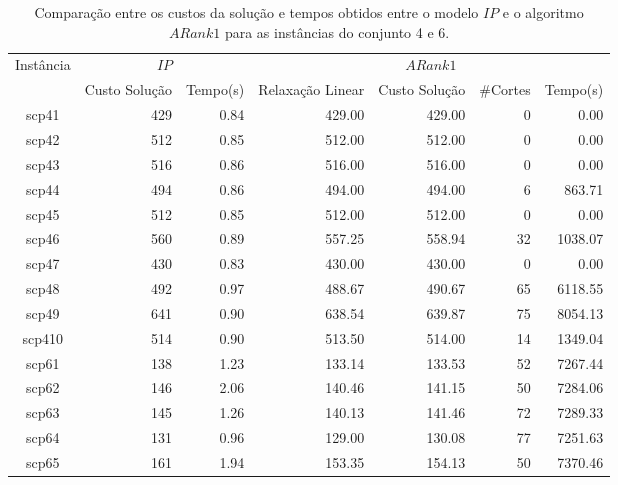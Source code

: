 \begin{table}[htbp]
\begin{center}
  \begin{tabular}{|c|r|r|r|r|r|r|}
    \hline
      Instância & \multicolumn{2}{|c|}{$IP$} & \multicolumn{4}{|c|}{$ARank1$}\\
                & Custo Solução    & Tempo(s)   & Relaxação Linear  & Custo Solução   & \#Cortes & Tempo(s)      \\ \hline
      scp41     & 429              & 0.84      & 429.00            & 429.00          & 0        & 0.00       \\ \hline
      scp42     & 512              & 0.85      & 512.00            & 512.00          & 0        & 0.00       \\ \hline
      scp43     & 516              & 0.86      & 516.00            & 516.00          & 0        & 0.00       \\ \hline
      scp44     & 494              & 0.86      & 494.00            & 494.00          & 6        & 863.71     \\ \hline
      scp45     & 512              & 0.85      & 512.00            & 512.00          & 0        & 0.00       \\ \hline
      scp46     & 560              & 0.89      & 557.25            & 558.94          & 32       & 1038.07    \\ \hline
      scp47     & 430              & 0.83      & 430.00            & 430.00          & 0        & 0.00       \\ \hline
      scp48     & 492              & 0.97      & 488.67            & 490.67          & 65       & 6118.55    \\ \hline
      scp49     & 641              & 0.90      & 638.54            & 639.87          & 75       & 8054.13    \\ \hline
      scp410    & 514              & 0.90      & 513.50            & 514.00          & 14       & 1349.04    \\ \hline
      scp61     & 138              & 1.23      & 133.14            & 133.53          & 52       & 7267.44    \\ \hline
      scp62     & 146              & 2.06      & 140.46            & 141.15          & 50       & 7284.06    \\ \hline
      scp63     & 145              & 1.26      & 140.13            & 141.46          & 72       & 7289.33    \\ \hline
      scp64     & 131              & 0.96      & 129.00            & 130.08          & 77       & 7251.63    \\ \hline
      scp65     & 161              & 1.94      & 153.35            & 154.13          & 50       & 7370.46    \\ \hline
  \end{tabular}
\caption{Comparação entre os custos da solução e tempos obtidos entre o modelo $IP$ e o algoritmo $ARank1$ para as instâncias do conjunto 4 e 6.}
\label{table:resultados4e6}
\end{center}
\end{table}

